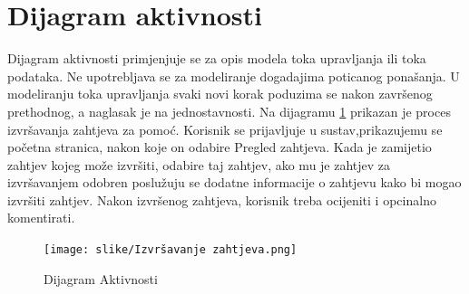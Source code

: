 \newpage
		\section{Dijagram aktivnosti}
			
		
			
			\text Dijagram aktivnosti primjenjuje se za opis modela toka upravljanja ili toka podataka. Ne upotrebljava se za modeliranje dogadajima poticanog ponašanja. U modeliranju toka upravljanja svaki novi korak poduzima se nakon završenog prethodnog, a naglasak je na jednostavnosti. Na dijagramu \ref{fig:4.11} prikazan je proces izvršavanja zahtjeva za pomoć. Korisnik se prijavljuje u sustav,prikazujemu se početna stranica, nakon koje on odabire Pregled zahtjeva. Kada je zamijetio zahtjev kojeg može izvršiti, odabire taj zahtjev, ako mu je zahtjev za izvršavanjem odobren poslužuju se dodatne informacije o zahtjevu kako bi mogao izvršiti zahtjev. Nakon izvršenog zahtjeva, korisnik treba ocijeniti i opcinalno komentirati.
			
			
		\begin{figure}[H]
			\texttt{[image: slike/Izvršavanje zahtjeva.png]} %
			\centering
			\caption { Dijagram Aktivnosti}
			\label{fig:4.11}
			\end{figure}

\newpage
